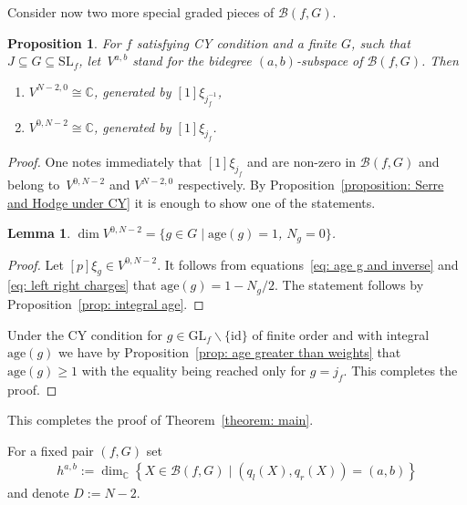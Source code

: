 \documentclass[10pt,a4paper]{amsart}
\numberwithin{equation}{section}
\newtheorem{Lemma}[Theorem]{Lemma}
\newtheorem{Proposition}[Theorem]{Proposition}
 { \theoremstyle{definition}
\newtheorem{Definition}[Theorem]{Definition}
\newtheorem{Note}[Theorem]{Note}
\newtheorem{Example}[Theorem]{Example}
\newtheorem{Remark}[Theorem]{Remark} }
\newcommand{\CC}{{\mathbb{C}}}
\newcommand{\SL}{{\mathrm{SL}}}
\newcommand{\GL}{{\mathrm{GL}}}
\newcommand{\id}{\mathrm{id}}
\newcommand{\age}{\mathrm{age}}
\def\B{{\mathcal B}}
\begin{document}
Consider now two more special graded pieces of $\B(f,G)$.

\begin{Proposition}\label{proposition: hd0}
	For $f$ satisfying CY condition and a finite $G$, such that $J \subseteq G \subseteq \SL_f$, let~$V^{a,b}$ stand for the bidegree $(a,b)$-subspace of $\B(f,G)$.
	Then
	\begin{enumerate}\itemsep=0pt
	 \item[$(1)$] $V^{N-2,0} \cong \CC$, generated by $[1]\xi_{j_f^{-1}}$,
	 \item[$(2)$] $V^{0,N-2} \cong \CC$, generated by $[1]\xi_{j_f}$.
	\end{enumerate}
\end{Proposition}
\begin{proof}
 One notes immediately that $[1]\xi_{j_f}$ and  are non-zero in $\B(f,G)$ and belong to~$V^{0,N-2}$ and $V^{N-2,0}$ respectively. By Proposition~\ref{proposition: Serre and Hodge under CY} it is enough to show one of the statements.

 \begin{Lemma}
 $\dim V^{0,N-2} = \lbrace g \in G \mid \age(g) = 1$, $ N_g = 0 \rbrace$.
 \end{Lemma}
 \begin{proof}
 Let $[p]\xi_g \in V^{0,N-2}$. It follows from equations~\eqref{eq: age g and inverse} and \eqref{eq: left right charges} that $\age(g) = 1 - N_g/2$. The statement follows by Proposition~\ref{prop: integral age}.
 \end{proof}

 Under the CY condition for $g \in \GL_f \backslash \lbrace \id \rbrace$ of finite order and with integral $\age(g)$ we have by Proposition~\ref{prop: age greater than weights} that $\age(g) \ge 1$ with the equality being reached only for $g = j_f$. This completes the proof.
\end{proof}

This completes the proof of Theorem~\ref{theorem: main}.

For a fixed pair $(f,G)$ set{\samepage
\begin{align*}
	h^{a,b} := \dim_\CC \left\lbrace X \in \B(f,G) \mid (q_l(X),q_r(X)) = (a,b)\right\rbrace
\end{align*}
and denote $D := N-2$.}
\end{document}
